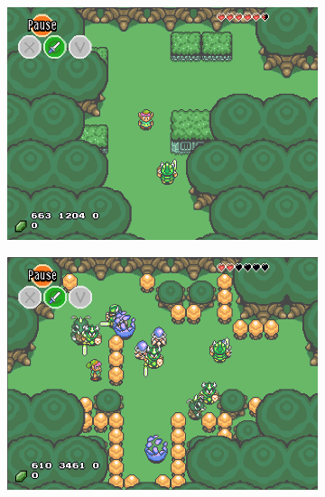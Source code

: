 \documentclass[a4paper]{article}
\begin{document}
\begin{multicols*}{2}
\begin{figure}[t]
\centering
\begin{subfigure}[b]{0.45\textwidth}
  \includegraphics[width=\textwidth]{tutorialroom}
\end{subfigure} \hfill
\begin{subfigure}[b]{0.45\textwidth}
  \includegraphics[width=\textwidth]{forestroom}
\end{subfigure} \hfill
\begin{subfigure}[b]{0.45\textwidth}

\end{subfigure}
\end{figure}
\end{multicols*}
\end{document}
